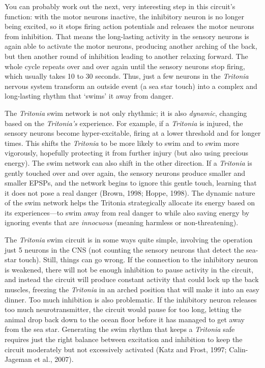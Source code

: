 \documentclass[
]{book}
\begin{document}
You can probably work out the next, very interesting step in this circuit's function: with the motor neurons inactive, the inhibitory neuron is no longer being excited, so it stops firing action potentials and releases the motor neurons from inhibition. That means the long-lasting activity in the sensory neurons is again able to activate the motor neurons, producing another arching of the back, but then another round of inhibition leading to another relaxing forward. The whole cycle repeats over and over again until the sensory neurons stop firing, which usually takes 10 to 30 seconds. Thus, just a few neurons in the \emph{Tritonia} nervous system transform an outside event (a sea star touch) into a complex and long-lasting rhythm that `swims' it away from danger.

The \emph{Tritonia} swim network is not only rhythmic; it is also \emph{dynamic}, changing based on the \emph{Tritonia's} experience. For example, if a \emph{Tritonia} is injured, the sensory neurons become hyper-excitable, firing at a lower threshold and for longer times. This shifts the \emph{Tritonia} to be more likely to swim and to swim more vigorously, hopefully protecting it from further injury (but also using precious energy). The swim network can also shift in the other direction. If a \emph{Tritonia} is gently touched over and over again, the sensory neurons produce smaller and smaller EPSPs, and the network begins to ignore this gentle touch, learning that it does not pose a real danger (Brown, 1998; Hoppe, 1998). The dynamic nature of the swim network helps the Tritonia strategically allocate its energy based on its experiences---to swim away from real danger to while also saving energy by ignoring events that are \emph{innocuous} (meaning harmless or non-threatening).

The \emph{Tritonia} swim circuit is in some ways quite simple, involving the operation just 5 neurons in the CNS (not counting the sensory neurons that detect the sea-star touch). Still, things can go wrong. If the connection to the inhibitory neuron is weakened, there will not be enough inhibition to pause activity in the circuit, and instead the circuit will produce constant activity that could lock up the back muscles, freezing the \emph{Tritonia} in an arched position that will make it into an easy dinner. Too much inhibition is also problematic. If the inhibitory neuron releases too much neurotransmitter, the circuit would pause for too long, letting the animal drop back down to the ocean floor before it has managed to get away from the sea star. Generating the swim rhythm that keeps a \emph{Tritonia} safe requires just the right balance between excitation and inhibition to keep the circuit moderately but not excessively activated (Katz and Frost, 1997; Calin-Jageman et al., 2007).
\end{document}
